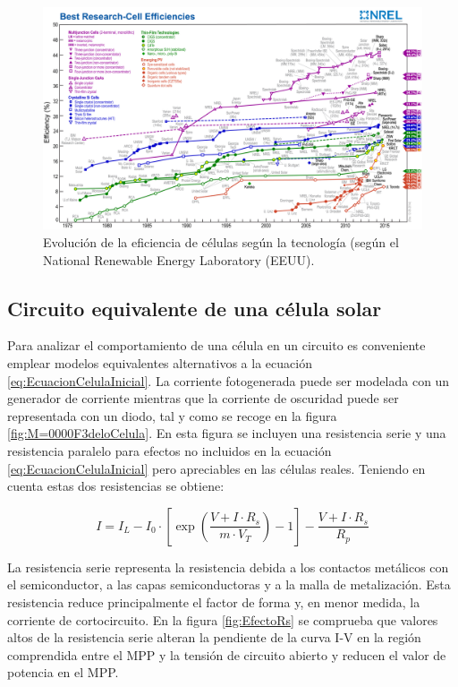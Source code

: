 %
\begin{figure}
\includegraphics[scale=0.35]{../figs/efficiency_chart_nrel.jpg}\caption{Evolución de la eficiencia de células según la tecnología (según el
National Renewable Energy Laboratory (EEUU).\label{fig:EvolucionEficienciaCelulas}}

\end{figure}



\subsection{Circuito equivalente de una célula solar}

Para analizar el comportamiento de una célula en un circuito es conveniente
emplear modelos equivalentes alternativos a la ecuación \ref{eq:EcuacionCelulaInicial}.
La corriente fotogenerada puede ser modelada con un generador de corriente
mientras que la corriente de oscuridad puede ser representada con
un diodo, tal y como se recoge en la figura \ref{fig:M=0000F3deloCelula}.
En esta figura se incluyen una resistencia serie y una resistencia
paralelo para efectos no incluidos en la ecuación \ref{eq:EcuacionCelulaInicial}
pero apreciables en las células reales. Teniendo en cuenta estas dos
resistencias se obtiene:

\begin{equation}
I=I_{L}-I_{0}\cdot[\exp(\frac{V+I\cdot R_{s}}{m\cdot V_{T}})-1]-\frac{V+I\cdot R_{s}}{R_{p}}\label{eq:CorrienteCelulaRsRp}\end{equation}

La resistencia serie representa la resistencia debida a los contactos
metálicos con el semiconductor, a las capas semiconductoras y a la
malla de metalización. Esta resistencia reduce principalmente el factor
de forma y, en menor medida, la corriente de cortocircuito. En la
figura \ref{fig:EfectoRs} se comprueba que valores altos de la resistencia
serie alteran la pendiente de la curva I-V en la región comprendida
entre el MPP y la tensión de circuito abierto y reducen el valor de
potencia en el MPP.

